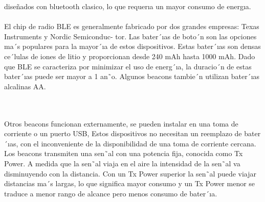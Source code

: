 \documentclass[conference,compsoc,onecolumn]{IEEEtran}
\begin{document}
diseñados con bluetooth clasico, lo que requerıa un mayor consumo de energıa.
\\
\\
El chip de radio BLE es generalmente fabricado por dos grandes empresas: Texas Instruments y Nordic Semiconduc- tor. Las bater´ıas de boto´n son las opciones ma´s populares para la mayor´ıa de estos dispositivos. Estas bater´ıas son densas  ce´lulas  de  iones  de  litio  y  proporcionan  desde  240  mAh  hasta  1000  mAh.  Dado  que  BLE  se  caracteriza por minimizar el uso de energ´ıa, la duracio´n de estas bater´ıas puede ser mayor a 1 an˜o. Algunos beacons tambie´n utilizan bater´ıas alcalinas AA.

\\
\\
Otros beacons funcionan externamente, se pueden instalar en una toma de corriente o un puerto USB, Estos dispositivos no necesitan un reemplazo de bater´ıas, con el inconveniente de la disponibilidad de una toma de corriente cercana. Los beacons transmiten una sen˜al con una potencia fija, conocida como Tx Power. A medida que la sen˜al viaja en el aire la  intensidad de la sen˜al va disminuyendo con la distancia.  Con un Tx Power superior la sen˜al puede viajar distancias ma´s largas, lo que significa mayor consumo y un Tx Power menor se traduce a menor rango de alcance pero menos consumo de bater´ıa.
\end{document}
